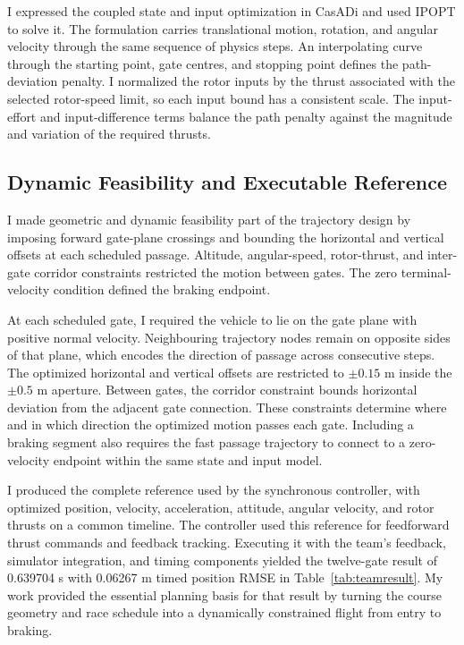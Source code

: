 \documentclass[letterpaper,10pt,conference]{ieeeconf}
\begin{document}
I expressed the coupled state and input optimization in CasADi and used IPOPT to solve it.
The formulation carries translational motion, rotation, and angular velocity through the same sequence of physics steps.
An interpolating curve through the starting point, gate centres, and stopping point defines the path-deviation penalty.
I normalized the rotor inputs by the thrust associated with the selected rotor-speed limit, so each input bound has a consistent scale.
The input-effort and input-difference terms balance the path penalty against the magnitude and variation of the required thrusts.

\subsection{Dynamic Feasibility and Executable Reference}
I made geometric and dynamic feasibility part of the trajectory design by imposing forward gate-plane crossings and bounding the horizontal and vertical offsets at each scheduled passage.
Altitude, angular-speed, rotor-thrust, and inter-gate corridor constraints restricted the motion between gates.
The zero terminal-velocity condition defined the braking endpoint.

At each scheduled gate, I required the vehicle to lie on the gate plane with positive normal velocity.
Neighbouring trajectory nodes remain on opposite sides of that plane, which encodes the direction of passage across consecutive steps.
The optimized horizontal and vertical offsets are restricted to $\pm0.15$ m inside the $\pm0.5$ m aperture.
Between gates, the corridor constraint bounds horizontal deviation from the adjacent gate connection.
These constraints determine where and in which direction the optimized motion passes each gate.
Including a braking segment also requires the fast passage trajectory to connect to a zero-velocity endpoint within the same state and input model.

I produced the complete reference used by the synchronous controller, with optimized position, velocity, acceleration, attitude, angular velocity, and rotor thrusts on a common timeline.
The controller used this reference for feedforward thrust commands and feedback tracking.
Executing it with the team's feedback, simulator integration, and timing components yielded the twelve-gate result of 0.639704 s with 0.06267 m timed position RMSE in Table~\ref{tab:teamresult}.
My work provided the essential planning basis for that result by turning the course geometry and race schedule into a dynamically constrained flight from entry to braking.
\end{document}
